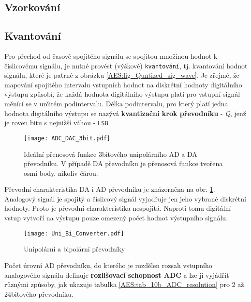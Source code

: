     \subsection{Vzorkování}
    \subsection{Kvantování}
       Pro přechod od časově spojitého signálu se spojitou množinou hodnot k číslicovému signálu, je nutné 
       provést (výškové) \texttt{kvantování}, tj. kvantování hodnot signálu, které je patrné z obrázku  
       \ref{AES:fig_Quntized_sig_wave}. Je zřejmé, že mapování spojitého intervalu vstupních
       hodnot na diskrétní hodnoty digitálního výstupu způsobí, že každá hodnota digitálního výstupu platí 
       pro vstupní signál měnící se v určitém  podintervalu. Délka podintervalu, pro který platí jedna 
       hodnota digitálního výstupu se nazývá \textbf{kvantizační krok převodníku} - \emph{Q}, jenž je roven 
       bitu s nejnižší váhou - \texttt{LSB}.

       \begin{figure}[ht!]
         \centering
         \texttt{[image: ADC\_DAC\_3bit.pdf]}
         \caption[Přenosová funkce AD a DA převodníku]{Ideální přenosová funkce 3bitového unipolárního AD 
                  a DA převodníku. V případě DA převodníku je přenosová funkce tvořena osmi body, nikoliv 
                  čárou.}
         \label{AES:fig_3b_DAC_ADC}
       \end{figure}
 
       Převodní charakteristika DA i AD převodníku je znázorněna na obr. \ref{AES:fig_3b_DAC_ADC}. Analogový 
       signál je spojitý a číslicový signál vyjadřuje jen jeho vybrané diskrétní hodnoty. Proto je převodní 
       charakteristika nespojitá. Naproti tomu digitální vstup vytvoří na výstupu pouze omezený počet hodnot 
       výstupního signálu.

       \begin{figure}[ht!]
         \centering
         \texttt{[image: Uni\_Bi\_Converter.pdf]}
         \caption[Unipolární a bipolární převodníky]{Unipolární a bipolární převodníky \cite{Kester2004}}
         \label{AES:fig_uni_bi_converter}
       \end{figure}

       Počet úrovní AD převodníku, do kterého je rozdělen rozsah vstupního analogového signálu definuje 
       \textbf{rozlišovací schopnost ADC} a lze ji vyjádřit různými způsoby, jak ukazuje tabulka 
       \ref{AES:tab_10b_ADC_resolution} pro 2 až 24bitového převodníku.

